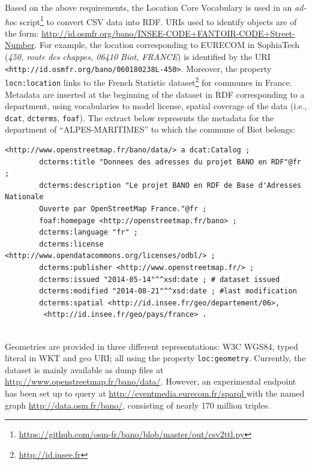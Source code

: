 
Based on the above requirements, the Location Core Vocabulary \cite{locnvocab} is used in an \textit{ad-hoc} script\footnote{\url{https://github.com/osm-fr/bano/blob/master/out/csv2ttl.py}} to convert CSV data into RDF. URIs used to identify objects are of the form: \url{http://id.osmfr.org/bano/INSEE-CODE+FANTOIR-CODE+Street-Number}. For example, the location corresponding to EURECOM in SophiaTech (\textit{450, route des chappes, 06410 Biot, FRANCE}) is identified by the URI \\
\texttt{<http://id.osmfr.org/bano/060180238L-450>}. Moreover, the property \\ \texttt{locn:location} links to the French Statistic dataset\footnote{\url{http://id.insee.fr}} for communes in France. Metadata are inserted at the beginning of the dataset in RDF corresponding to a department, using vocabularies to model license, spatial coverage of the data (i.e., \texttt{dcat}, \texttt{dcterms}, \texttt{foaf}). The extract below represents the metadata for the department of ``ALPES-MARITIMES'' to which the commune of Biot belongs:

\begin{lstlisting}
<http://www.openstreetmap.fr/bano/data/> a dcat:Catalog ;
		dcterms:title "Donnees des adresses du projet BANO en RDF"@fr ;
		dcterms:description "Le projet BANO en RDF de Base d'Adresses Nationale
		Ouverte par OpenStreetMap France."@fr ;
		foaf:homepage <http://openstreetmap.fr/bano> ;
		dcterms:language "fr" ;
		dcterms:license <http://www.opendatacommons.org/licenses/odbl/> ;
		dcterms:publisher <http://www.openstreetmap.fr/> ;
		dcterms:issued "2014-05-14"^^xsd:date ; # dataset issued
		dcterms:modified "2014-08-21"^^xsd:date ; #last modification
		dcterms:spatial <http://id.insee.fr/geo/departement/06>,
		 <http://id.insee.fr/geo/pays/france> .
		
\end{lstlisting}

Geometries are provided in three different representations: W3C WGS84, typed literal in WKT and geo URI; all using the property \texttt{loc:geometry}. Currently, the dataset is mainly available as dump files at \url{http://www.openstreetmap.fr/bano/data/}. However, an experimental endpoint has been set up to query at \url{http://eventmedia.eurecom.fr/sparql } with the named graph \url{http://data.osm.fr/bano/}, consisting of nearly 170 million triples.

